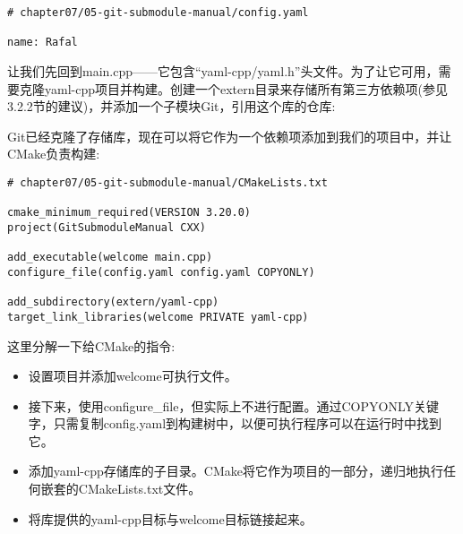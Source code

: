\begin{lstlisting}[style=styleCMake]
# chapter07/05-git-submodule-manual/config.yaml

name: Rafal
\end{lstlisting}

让我们先回到main.cpp——它包含“yaml-cpp/yaml.h”头文件。为了让它可用，需要克隆yaml-cpp项目并构建。创建一个extern目录来存储所有第三方依赖项(参见3.2.2节的建议)，并添加一个子模块Git，引用这个库的仓库:


Git已经克隆了存储库，现在可以将它作为一个依赖项添加到我们的项目中，并让CMake负责构建:

\begin{lstlisting}[style=styleCMake]
# chapter07/05-git-submodule-manual/CMakeLists.txt

cmake_minimum_required(VERSION 3.20.0)
project(GitSubmoduleManual CXX)

add_executable(welcome main.cpp)
configure_file(config.yaml config.yaml COPYONLY)

add_subdirectory(extern/yaml-cpp)
target_link_libraries(welcome PRIVATE yaml-cpp)
\end{lstlisting}

这里分解一下给CMake的指令:

\begin{itemize}
\item 
设置项目并添加welcome可执行文件。

\item 
接下来，使用configure\_file，但实际上不进行配置。通过COPYONLY关键字，只需复制config.yaml到构建树中，以便可执行程序可以在运行时中找到它。

\item 
添加yaml-cpp存储库的子目录。CMake将它作为项目的一部分，递归地执行任何嵌套的CMakeLists.txt文件。

\item 
将库提供的yaml-cpp目标与welcome目标链接起来。
\end{itemize}

